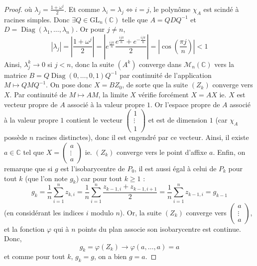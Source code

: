 \begin{proof}
    où $\lambda_j = \frac{1+\omega^j}{2}$. Et comme $\lambda_i = \lambda_j \iff i = j$, le polynôme $\chi_A$ est scindé à racines simples. Donc $\exists Q \in \mathrm{GL}_n(\mathbb{C})$ telle que $A=QDQ^{-1}$ et $D = \operatorname{Diag}(\lambda_1, \dots, \lambda_n)$. Or pour $j \neq n$,
    \[ |\lambda_j| = \left| \frac{1 + \omega^j}{2} \right| = \left| e^{\frac{ij \pi}{n}} \frac{e^{\frac{ij \pi}{n}} + e^{-\frac{ij \pi}{n}}}{2} \right| = \left| \cos \left( \frac{\pi j}{n} \right) \right| < 1 \]
    Ainsi, $\lambda_j^k \longrightarrow 0$ si $j < n$, donc la suite $(A^k)$ converge dans $\mathcal{M}_n(\mathbb{C})$ vers la matrice $B = Q \operatorname{Diag}(0, \dots, 0, 1)Q^{-1}$ par continuité de l'application $M \mapsto QMQ^{-1}$.
    \newpar
    On pose donc $X = B Z_0$, de sorte que la suite $(Z_k)$ converge vers $X$. Par continuité de $M \mapsto AM$, la limite $X$ vérifie forcément $X = AX$ ie. $X$ est vecteur propre de $A$ associé à la valeur propre $1$. Or l'espace propre de $A$ associé à la valeur propre $1$ contient le vecteur $\begin{pmatrix} 1 \\ \vdots \\ 1 \end{pmatrix}$ et est de dimension $1$ (car $\chi_A$ possède $n$ racines distinctes), donc il est engendré par ce vecteur. Ainsi, il existe $a \in \mathbb{C}$ tel que $X = \begin{pmatrix} a \\ \vdots \\ a \end{pmatrix}$ ie. $(Z_k)$ converge vers le point d'affixe $a$.
    \newpar
    Enfin, on remarque que si $g$ est l'isobarycentre de $P_0$, il est aussi égal à celui de $P_k$ pour tout $k$ (que l'on note $g_k$) car pour tout $k \geq 1$ :
    \[ g_k = \frac{1}{n} \sum_{i=1}^n z_{k,i} = \frac{1}{n} \sum_{i=1}^n \frac{z_{k-1,i} + z_{k-1,i+1}}{2} = \frac{1}{n} \sum_{i=1}^n z_{k-1,i} = g_{k-1} \]
    (en considérant les indices $i$ modulo $n$). Or, la suite $(Z_k)$ converge vers $\begin{pmatrix} a \\ \vdots \\ a \end{pmatrix}$, et la fonction $\varphi$ qui à $n$ points du plan associe son isobarycentre est continue. Donc,
    \[ g_k = \varphi(Z_k) \longrightarrow \varphi(a, \dots, a) = a \]
    et comme pour tout $k$, $g_k = g$, on a bien $g = a$.
  \end{proof}

